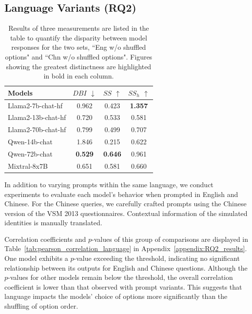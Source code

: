 \documentclass[11pt]{article}
\begin{document}
\subsection{Language Variants (RQ2)}
\label{sec:rq2}

\begin{table}[!hbt]
\centering
\setlength\tabcolsep{4pt}
\renewcommand{\arraystretch}{1.2}
\begin{tabular}{l|c|c|c}
\hline
\textbf{Models} & { \textbf{$DBI$} $\downarrow$ } & {\textbf{$SS$} $\uparrow$ } & {\textbf{$SS_h$} $\uparrow$ } \\
\hline
{Llama2-7b-chat-hf} & 0.962 & 0.423 & \textbf{1.357} \\
{Llama2-13b-chat-hf} & 0.720 & 0.533 & 0.581 \\
{Llama2-70b-chat-hf} & 0.799 & 0.499 & 0.707 \\
{Qwen-14b-chat} & 1.846 & 0.215 & 0.622 \\
{Qwen-72b-chat} & \textbf{0.529} & \textbf{0.646} & 0.961 \\
{Mixtral-8x7B} & 0.651 & 0.581 & 0.660 \\

\hline
\end{tabular}
\caption{Results of three measurements are listed in the table to quantify the disparity between model responses for the two sets, ``Eng w/o shuffled options" and ``Chn w/o shuffled options". Figures showing the greatest distinctness are highlighted in bold in each column. }
\label{tab:distance_between_languages}

\end{table}


In addition to varying prompts within the same language, we conduct experiments to evaluate each model's behavior when prompted in English and Chinese. For the Chinese queries, we carefully crafted prompts using the Chinese version of the VSM 2013 questionnaires. Contextual information of the simulated identities is manually translated.

Correlation coefficients and $p$-values of this group of comparisons are displayed in Table~\ref{tab:pearson_correlation_language} in Appendix~\ref{appendix:RQ2_results}. One model exhibits a $p$-value exceeding the threshold, indicating no significant relationship between its outputs for English and Chinese questions.
Although the $p$-values for other models remain below the threshold, the overall correlation coefficient is lower than that observed with prompt variants. This suggests that language impacts the models' choice of options more significantly than the shuffling of option order.
\end{document}
